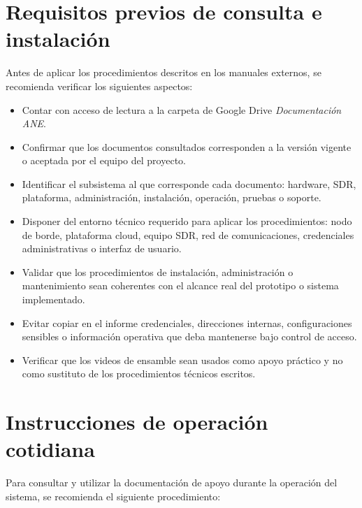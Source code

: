 \section{Requisitos previos de consulta e instalación}

Antes de aplicar los procedimientos descritos en los manuales externos, se recomienda verificar los siguientes aspectos:

\begin{itemize}
    \item Contar con acceso de lectura a la carpeta de Google Drive \textit{Documentación ANE}.
    \item Confirmar que los documentos consultados corresponden a la versión vigente o aceptada por el equipo del proyecto.
    \item Identificar el subsistema al que corresponde cada documento: hardware, SDR, plataforma, administración, instalación, operación, pruebas o soporte.
    \item Disponer del entorno técnico requerido para aplicar los procedimientos: nodo de borde, plataforma cloud, equipo SDR, red de comunicaciones, credenciales administrativas o interfaz de usuario.
    \item Validar que los procedimientos de instalación, administración o mantenimiento sean coherentes con el alcance real del prototipo o sistema implementado.
    \item Evitar copiar en el informe credenciales, direcciones internas, configuraciones sensibles o información operativa que deba mantenerse bajo control de acceso.
    \item Verificar que los videos de ensamble sean usados como apoyo práctico y no como sustituto de los procedimientos técnicos escritos.
\end{itemize}

\section{Instrucciones de operación cotidiana}

Para consultar y utilizar la documentación de apoyo durante la operación del sistema, se recomienda el siguiente procedimiento:

